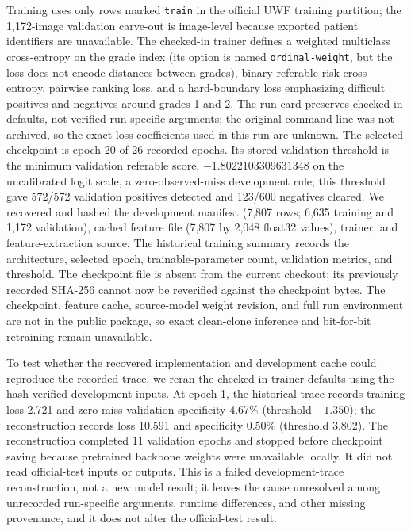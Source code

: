 \documentclass{ieeeaccess}
\begin{document}
Training uses only rows marked \texttt{train} in the official UWF training partition; the 1,172-image validation carve-out is image-level because exported patient identifiers are unavailable. The checked-in trainer defines a weighted multiclass cross-entropy on the grade index (its option is named \texttt{ordinal-weight}, but the loss does not encode distances between grades), binary referable-risk cross-entropy, pairwise ranking loss, and a hard-boundary loss emphasizing difficult positives and negatives around grades 1 and 2. The run card preserves checked-in defaults, not verified run-specific arguments; the original command line was not archived, so the exact loss coefficients used in this run are unknown. The selected checkpoint is epoch 20 of 26 recorded epochs. Its stored validation threshold is the minimum validation referable score, $-1.8022103309631348$ on the uncalibrated logit scale, a zero-observed-miss development rule; this threshold gave 572/572 validation positives detected and 123/600 negatives cleared. We recovered and hashed the development manifest (7,807 rows; 6,635 training and 1,172 validation), cached feature file (7,807 by 2,048 float32 values), trainer, and feature-extraction source. The historical training summary records the architecture, selected epoch, trainable-parameter count, validation metrics, and threshold. The checkpoint file is absent from the current checkout; its previously recorded SHA-256 cannot now be reverified against the checkpoint bytes. The checkpoint, feature cache, source-model weight revision, and full run environment are not in the public package, so exact clean-clone inference and bit-for-bit retraining remain unavailable.

To test whether the recovered implementation and development cache could reproduce the recorded trace, we reran the checked-in trainer defaults using the hash-verified development inputs. At epoch 1, the historical trace records training loss 2.721 and zero-miss validation specificity 4.67\% (threshold $-1.350$); the reconstruction records loss 10.591 and specificity 0.50\% (threshold $3.802$). The reconstruction completed 11 validation epochs and stopped before checkpoint saving because pretrained backbone weights were unavailable locally. It did not read official-test inputs or outputs. This is a failed development-trace reconstruction, not a new model result; it leaves the cause unresolved among unrecorded run-specific arguments, runtime differences, and other missing provenance, and it does not alter the official-test result.
\end{document}
